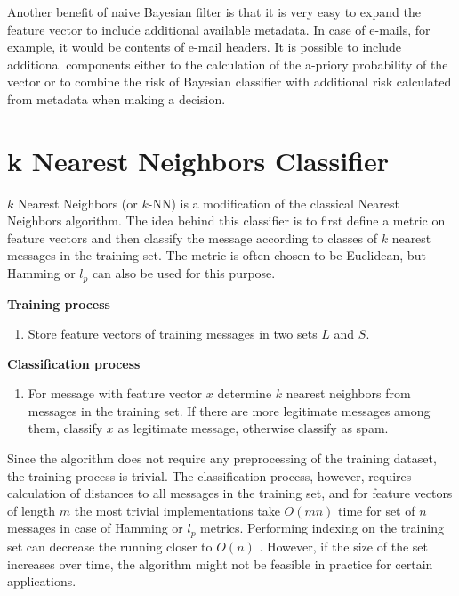 \documentclass[12pt]{report}
\begin{document}
Another benefit of naive Bayesian filter is that it is very easy to expand the feature vector to include additional available metadata. In case of e-mails, for example, it would be contents of e-mail headers. It is possible to include additional components either to the calculation of the a-priory probability of the vector or to combine the risk of Bayesian classifier with additional risk calculated from metadata when making a decision.

\newpage

\section{k Nearest Neighbors Classifier}

$k$ Nearest Neighbors (or $k$-NN) is a modification of the classical Nearest Neighbors algorithm. The idea behind this classifier is to first define a metric on feature vectors and then classify the message according to classes of $k$ nearest messages in the training set. The metric is often chosen to be Euclidean, but Hamming or $l_p$ can also be used for this purpose.

\textbf{Training process}

\begin{enumerate}
	\item Store feature vectors of training messages in two sets $L$ and $S$.
\end{enumerate}

\textbf{Classification process}

\begin{enumerate}
	\item For message with feature vector $x$ determine $k$ nearest neighbors from messages in the training set. If there are more legitimate messages among them, classify $x$ as legitimate message, otherwise classify as spam.
\end{enumerate}

Since the algorithm does not require any preprocessing of the training dataset, the training process is trivial. The classification process, however, requires calculation of distances to all messages in the training set, and for feature vectors of length $m$ the most trivial implementations take $O(mn)$ time for set of $n$ messages in case of Hamming or $l_p$ metrics. Performing indexing on the training set can decrease the running closer to $O(n)$ \cite{Tretyakov}. However, if the size of the set increases over time, the algorithm might not be feasible in practice for certain applications.
\end{document}
